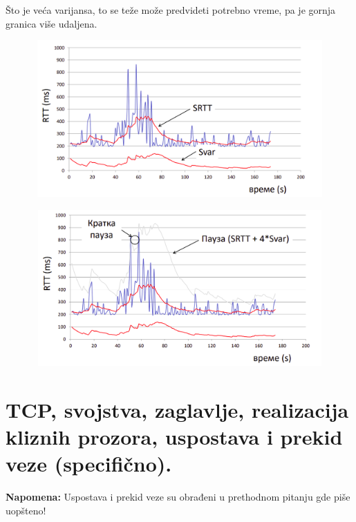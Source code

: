 \documentclass[a4paper]{article}
\begin{document}
        Što je veća varijansa, to se teže može predvideti potrebno vreme, pa je gornja granica
        više udaljena.
        \begin{figure}[H]
            \begin{center}
                \includegraphics[width=120mm,height=60mm]{Slike/tcp_retransmisija3.png}
            \end{center}
        \end{figure}
        \begin{figure}[H]
            \begin{center}
                \includegraphics[width=120mm,height=60mm]{Slike/tcp_retransmisija4.png}
            \end{center}
        \end{figure}

\section{TCP, svojstva, zaglavlje, realizacija kliznih prozora, uspostava i prekid veze (specifično). }
    \textbf{Napomena:} Uspostava i prekid veze su obrađeni u prethodnom pitanju gde piše uopšteno!\\
\end{document}
